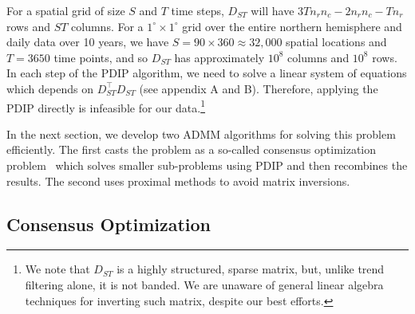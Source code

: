 \documentclass[letterpaper]{article} %
\DeclareMathOperator*{\argmin}{argmin}
\newcommand{\norm}[1]{\left\lVert #1 \right\rVert}
\begin{document}
For a spatial grid of size $S$ and $T$ time steps, $D_{ST}$ will have
$3Tn_rn_c-2n_rn_c-Tn_r$ rows and $ST$ columns. For a $1^\circ\times
1^\circ$ grid over the entire northern hemisphere and daily data over
10 years, we have $S=90\times 360\approx 32,000$ spatial locations and
$T=3650$ time points, and so $D_{ST}$ has
approximately $10^8$ columns and $10^8$ rows. In each step of the PDIP
algorithm, we need to solve a linear system of equations which
depends on $D_{ST}^\top D_{ST}$ (see appendix A and B). Therefore,
applying the PDIP directly is infeasible for our data.\footnote{We
  note that $D_{ST}$ is a highly structured, sparse matrix, but, unlike
  trend filtering alone, it is not banded. We are unaware of general
  linear algebra techniques for inverting such matrix, despite our
  best efforts.}  

In the next section, we develop two ADMM algorithms for solving this
problem efficiently. The first casts the problem as a
so-called consensus optimization problem~\cite{boyd_distributed_2011}
which solves smaller sub-problems using PDIP and then recombines the results. The
second uses proximal methods to avoid matrix inversions.
 

\subsection{Consensus Optimization}
\label{sec:consOpt}

\end{document}
